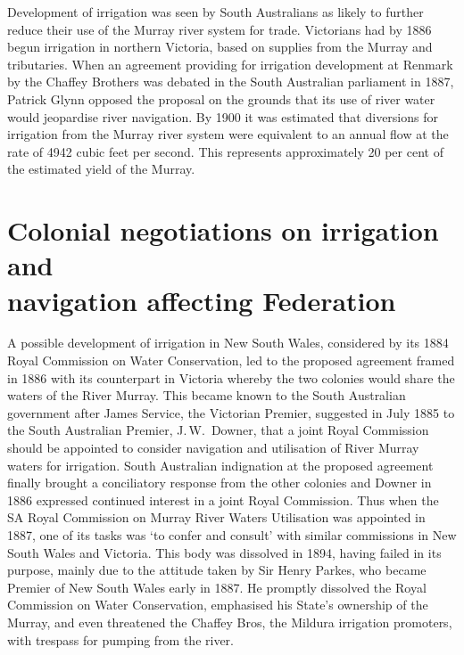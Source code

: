 Development of irrigation was seen by South Australians as likely to
further reduce their use of the Murray river system for trade.
Victorians had by 1886 begun irrigation in northern Victoria, based on
supplies from the Murray and tributaries.  When an agreement providing
for irrigation development at Renmark  by the
Chaffey Brothers  was debated in the South
Australian parliament in 1887, Patrick Glynn 
opposed the proposal on the grounds that its use of river water would
jeopardise river navigation. By 1900 it was estimated that diversions
for irrigation from the Murray river system were equivalent to an
annual flow at the rate of 4942 cubic feet per second. This represents
approximately 20 per cent of the estimated yield of the
Murray.

\section*{Colonial negotiations on irrigation and \\
navigation affecting Federation}

A possible development of irrigation in New South Wales, considered by
its 1884 Royal Commission on Water Conservation,  led to the proposed agreement
framed in 1886 with its counterpart in Victoria where\-by the two
colonies would share the waters of the River Murray. This became known
to the South Australian government after James Service,
 the Victorian Premier, suggested in July 1885 to
the South Australian Premier, J.\,W.~Downer, 
that a joint Royal Commission should be appointed to consider
navigation and utilisation of River Murray waters for irrigation.
South Australian indignation at the proposed agreement finally brought
a conciliatory response from the other colo\-nies and Downer in 1886
expressed continued interest in a joint Royal Commission.  Thus when
the SA Royal Commission on Murray River Waters Utilisation was
appointed in 1887,  one of its tasks was `to confer and consult' with similar
commissions in New South Wales and Victoria.  This body was dissolved
in 1894, having failed in its purpose, mainly due to the attitude
taken by Sir Henry Parkes,  who became Premier of
New South Wales early in 1887.  He promptly dissolved the Royal
Commission on Water Conservation, emphasised his State's ownership of
the Murray, and even threatened the Chaffey Bros, the Mildura
irrigation promoters, with trespass for pumping from the river.

